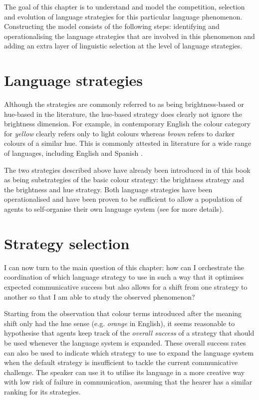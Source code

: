 The goal of this chapter is to understand and model the competition,
selection and evolution of language strategies for this particular
language phenomenon. Constructing the model consists of the following
steps: identifying and operationalising the language strategies that
are involved in this phenomenon and adding an extra layer of
linguistic selection at the level of language strategies.

\section{Language strategies}

Although the strategies are commonly referred to as
being bright\-ness-based or hue-based in the literature, the hue-based strategy does
clearly not ignore the brightness dimension. For example, in
contemporary English the colour category for \textit{yellow} clearly refers
only to light colours whereas \textit{brown} refers to darker colours of a
similar hue. This is commonly attested in literature for a wide range
of languages, including English \citep{sturges95location,
  boynton97insights} and Spanish \citep{lillo07locating}.

The two strategies described above have already been introduced in
 of this book as being substrategies
of the basic colour strategy: the brightness strategy
and the brightness and hue strategy. Both language strategies
have been operationalised and have been proven to be sufficient to
allow a population of agents to self-organise their own language
system (see  for more details).

\section{Strategy selection}

I can now turn to the main question of this chapter: how can I
orchestrate the coordination of which language strategy to use in such
a way that it optimises expected communicative success but also allows
for a shift from one strategy to another so that I am able to study
the observed phenomenon?

Starting from the observation that colour terms introduced after the
meaning shift only had the hue sense (e.g. \textit{orange} in English), it
seems reasonable to hypothesise that agents keep track of the
\emph{overall success} of a strategy that should be used whenever the
language system is expanded. These overall success rates can also be
used to indicate which strategy to use to expand the language system
when the default strategy is insufficient to tackle the current
communicative challenge. The speaker can use it to utilise its language in
a more creative way with low risk of failure in communication, assuming
that the hearer has a similar ranking for its strategies.

